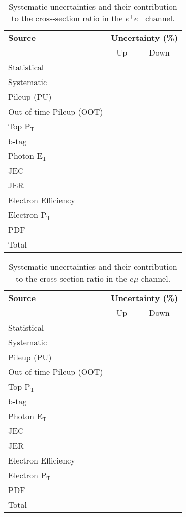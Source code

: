 \begin{table}[h!] 
\centering
\begin{tabular}{|l|c|c|}
\hline
\textbf{Source} & \multicolumn{2}{c|}{\textbf{Uncertainty (\%)}} \\ \cline{2-3}
 & Up & Down \\
\hline
Statistical & & \\
\hline
Systematic & & \\
\hline
Pileup (PU) & & \\
Out-of-time Pileup (OOT) & & \\
Top P$_{\text{T}}$ & & \\
b-tag & & \\
Photon E$_{\text{T}}$ & & \\
JEC & & \\
JER & & \\
Electron Efficiency & & \\
Electron P$_{\text{T}}$ & & \\
PDF & & \\
\hline
Total & & \\
\hline
\end{tabular} 
\caption{Systematic uncertainties and their contribution to the cross-section ratio in the $e^+e^-$ channel.}
\label{tab-systuncertsEE}
\end{table}

\begin{table}[h!] 
\centering
\begin{tabular}{|l|c|c|}
\hline
\textbf{Source} & \multicolumn{2}{c|}{\textbf{Uncertainty (\%)}} \\ \cline{2-3}
 & Up & Down \\
\hline
Statistical & & \\
\hline
Systematic & & \\
\hline
Pileup (PU) & & \\
Out-of-time Pileup (OOT) & & \\
Top P$_{\text{T}}$ & & \\
b-tag & & \\
Photon E$_{\text{T}}$ & & \\
JEC & & \\
JER & & \\
Electron Efficiency & & \\
Electron P$_{\text{T}}$ & & \\
PDF & & \\
\hline
Total & & \\
\hline
\end{tabular} 
\caption{Systematic uncertainties and their contribution to the cross-section ratio in the $e\mu$ channel.}
\label{tab-systuncertsEMu}
\end{table}

